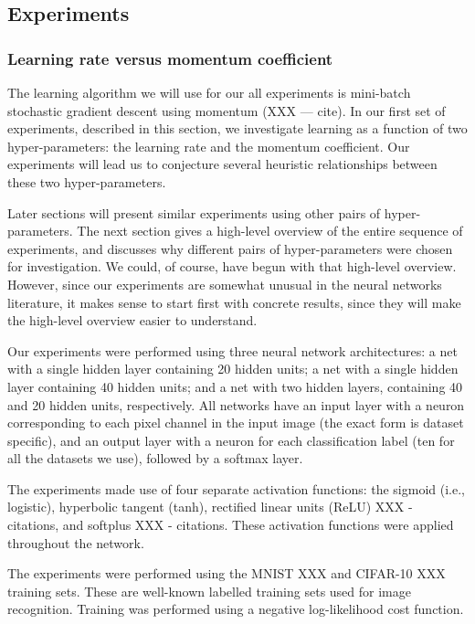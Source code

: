 \documentclass[10pt]{article}
\begin{document}
\subsection*{Experiments}

\subsubsection*{Learning rate versus momentum coefficient}

The learning algorithm we will use for our all experiments is
mini-batch stochastic gradient descent using momentum (XXX --- cite).
In our first set of experiments, described in this section, we
investigate learning as a function of two hyper-parameters: the
learning rate and the momentum coefficient.  Our experiments will lead
us to conjecture several heuristic relationships between these two
hyper-parameters.

Later sections will present similar experiments using other pairs of
hyper-parameters.  The next section gives a high-level overview of the
entire sequence of experiments, and discusses why different pairs of
hyper-parameters were chosen for investigation.  We could, of course,
have begun with that high-level overview.  However, since our
experiments are somewhat unusual in the neural networks literature, it
makes sense to start first with concrete results, since they will make
the high-level overview easier to understand.

Our experiments were performed using three neural network
architectures: a net with a single hidden layer containing 20 hidden
units; a net with a single hidden layer containing 40 hidden units;
and a net with two hidden layers, containing 40 and 20 hidden units,
respectively. All networks have an input layer with a neuron
corresponding to each pixel channel in the input image (the exact form
is dataset specific), and an output layer with a neuron for each
classification label (ten for all the datasets we use), followed by a
softmax layer.

The experiments made use of four separate activation functions: the
sigmoid (i.e., logistic), hyperbolic tangent (tanh), rectified linear
units (ReLU) XXX - citations, and softplus XXX - citations.  These
activation functions were applied throughout the network.

The experiments were performed using the MNIST XXX and CIFAR-10 XXX
training sets.  These are well-known labelled training sets used for
image recognition.  Training was performed using a negative
log-likelihood cost function.
\end{document}
